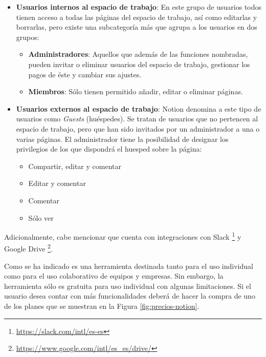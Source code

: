 \begin{itemize}
    \item \textbf{Usuarios internos al espacio de trabajo}: En este grupo de usuarios todos tienen acceso a todas las páginas del espacio de trabajo, así como editarlas y borrarlas, pero existe una subcategoría más que agrupa a los usuarios en dos grupos:
        \begin{itemize}
            \item \textbf{Administradores}: Aquellos que además de las funciones nombradas, pueden invitar o eliminar usuarios del espacio de trabajo, gestionar los pagos de éste y cambiar sus ajustes.
            \item \textbf{Miembros}: Sólo tienen permitido añadir, editar o eliminar páginas.
        \end{itemize}
    
    \item \textbf{Usuarios externos al espacio de trabajo}: Notion denomina a este tipo de usuarios como \textit{Guests} (huéspedes). Se tratan de usuarios que no pertencen al espacio de trabajo, pero que han sido invitados por un administrador a una o varias páginas. El administrador tiene la posibilidad de designar los privilegios de los que dispondrá el huesped sobre la página:
        \begin{itemize}
            \item Compartir, editar y comentar
            \item Editar y comentar
            \item Comentar
            \item Sólo ver
        \end{itemize}
\end{itemize}

Adicionalmente, cabe mencionar que cuenta con integraciones con Slack \footnote{\url{https://slack.com/intl/es-es}} y Google Drive \footnote{\url{https://www.google.com/intl/es_es/drive/}}. \bigskip

Como se ha indicado es una herramienta destinada tanto para el uso individual como para el uso colaborativo de equipos y empresas. Sin embargo, la herramienta sólo es gratuita para uso individual con algunas limitaciones. Si el usuario desea contar con más funcionalidades deberá de hacer la compra de uno de los planes que se muestran en la Figura \ref{fig:precios-notion}.

